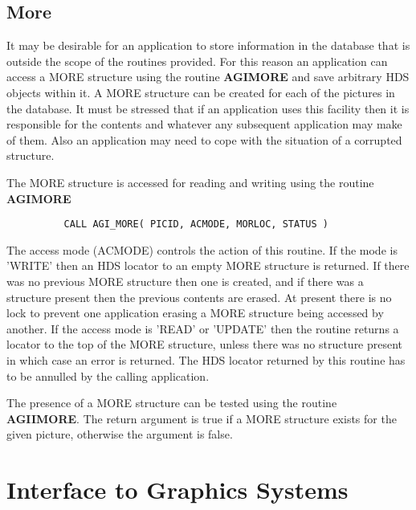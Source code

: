 \documentclass[twoside,11pt]{article}
\newcommand{\htmlref}[2]{#1}
\renewcommand{\_}{\texttt{\symbol{95}}}
\begin{document}
\subsection{More}
It may be desirable for an application to store information in the database
that is outside the scope of the routines provided. For this reason an
application can access a MORE structure using the routine 
\htmlref{{\bf AGI\_MORE}}{AGI_MORE}
and save arbitrary HDS objects within it. A MORE structure can be created
for each of the pictures in the database. It must be stressed that if an
application uses this facility then it is responsible for the contents
and whatever any subsequent application may make of them. Also an
application may need to cope with the situation of a corrupted structure.

The MORE structure is accessed for reading and writing using the routine
{\bf AGI\_MORE}
\begin{verbatim}
          CALL AGI_MORE( PICID, ACMODE, MORLOC, STATUS )
\end{verbatim}
The access mode (ACMODE) controls the action of this routine. If the mode
is 'WRITE' then an HDS locator to an empty MORE structure is returned. If
there was no previous MORE structure then one is created, and if there was
a structure present then the previous contents are erased. At present
there is no lock to prevent one application erasing a MORE structure being
accessed by another. If the access mode is 'READ' or 'UPDATE' then the
routine returns a locator to the top of the MORE structure, unless there
was no structure present in which case an error is returned. The HDS
locator returned by this routine has to be annulled by the calling
application.

The presence of a MORE structure can be tested using the routine
{\bf AGI\_IMORE}. The return argument is true if a MORE structure exists
for the given picture, otherwise the argument is false.


\section {Interface to Graphics Systems}
\end{document}
